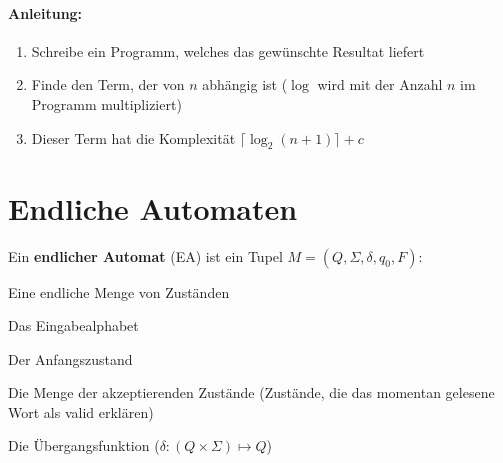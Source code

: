 \documentclass[11pt]{article}
\begin{document}
\paragraph{Anleitung:}
\begin{enumerate}[noitemsep]
	\item Schreibe ein Programm, welches das gewünschte Resultat liefert
	\item Finde den Term, der von $n$ abhängig ist ($\log$ wird mit der Anzahl $n$ im Programm multipliziert)
	\item Dieser Term hat die Komplexität $\lceil \log_2(n + 1) \rceil + c$
\end{enumerate}

\section{Endliche Automaten}

Ein \textbf{endlicher Automat} (EA) ist ein Tupel $M = (Q, \Sigma, \delta, q_0, F)$:
\begin{description}[labelindent=16pt,style=multiline,leftmargin=2.5cm, noitemsep]
	\item[$Q$:] Eine endliche Menge von Zust{\"a}nden
	\item[$\Sigma$:] Das Eingabealphabet
	\item[$q_0 \in Q$:] Der Anfangszustand
	\item[$F \subseteq Q$:] Die Menge der akzeptierenden Zust{\"a}nde (Zust{\"a}nde, die das momentan gelesene Wort als valid erkl{\"a}ren)
	\item[$\delta$:] Die {\"U}bergangsfunktion ($\delta: (Q\times\Sigma) \mapsto Q$)
\end{description}
\end{document}
